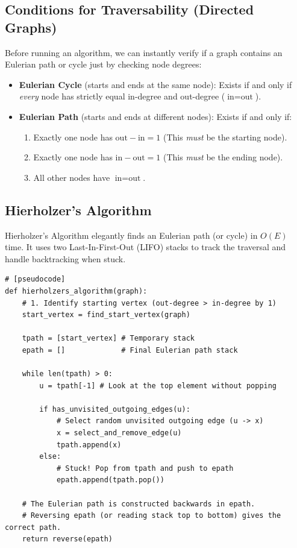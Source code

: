 \documentclass[11pt, a4paper]{article}
\begin{document}
\subsection{Conditions for Traversability (Directed Graphs)}
Before running an algorithm, we can instantly verify if a graph contains an Eulerian path or cycle just by checking node degrees:
\begin{itemize}
    \item \textbf{Eulerian Cycle} (starts and ends at the same node): Exists if and only if \textit{every} node has strictly equal in-degree and out-degree ($\text{in} = \text{out}$).
    \item \textbf{Eulerian Path} (starts and ends at different nodes): Exists if and only if:
    \begin{enumerate}
        \item Exactly one node has $\text{out} - \text{in} = 1$ (This \textit{must} be the starting node).
        \item Exactly one node has $\text{in} - \text{out} = 1$ (This \textit{must} be the ending node).
        \item All other nodes have $\text{in} = \text{out}$.
    \end{enumerate}
\end{itemize}

\subsection{Hierholzer's Algorithm}
Hierholzer's Algorithm elegantly finds an Eulerian path (or cycle) in $O(E)$ time. It uses two Last-In-First-Out (LIFO) stacks to track the traversal and handle backtracking when stuck.

\begin{verbatim}
# [pseudocode]
def hierholzers_algorithm(graph):
    # 1. Identify starting vertex (out-degree > in-degree by 1)
    start_vertex = find_start_vertex(graph)
    
    tpath = [start_vertex] # Temporary stack
    epath = []             # Final Eulerian path stack
    
    while len(tpath) > 0:
        u = tpath[-1] # Look at the top element without popping
        
        if has_unvisited_outgoing_edges(u):
            # Select random unvisited outgoing edge (u -> x)
            x = select_and_remove_edge(u)
            tpath.append(x)
        else:
            # Stuck! Pop from tpath and push to epath
            epath.append(tpath.pop())
            
    # The Eulerian path is constructed backwards in epath.
    # Reversing epath (or reading stack top to bottom) gives the correct path.
    return reverse(epath)
\end{verbatim}
\end{document}

